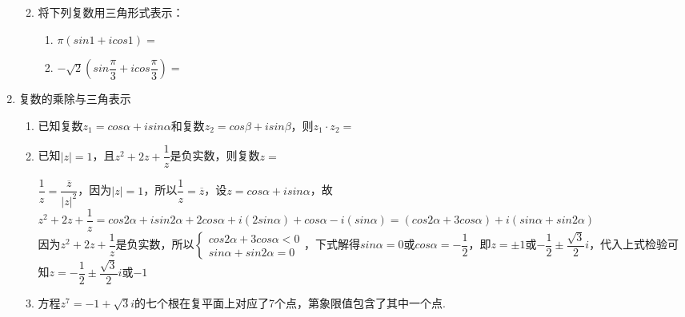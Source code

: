 \begin{enumerate}
\begin{enumerate}
    \item 将下列复数用三角形式表示：
    \begin{enumerate}
        \item $\pi(sin1 + i cos1) = $
        \item $-\sqrt{2}\left(sin\dfrac{\pi}{3}+icos\dfrac{\pi}{3}\right) = $
    \end{enumerate}
\end{enumerate}
\item 复数的乘除与三角表示
\begin{enumerate}
    \item 已知复数$z_1 = cos\alpha + i  sin\alpha$和复数$z_2 = cos\beta + i  sin\beta$，则$z_1 \cdot z_2 = $
    \item 已知$|z| = 1$，且$z^2+2z+\dfrac{1}{z}$是负实数，则复数$z = $
    \begin{jieda}
        $\dfrac{1}{z} = \dfrac{\overline{z}}{|z|^2}$，因为$|z| = 1$，所以$\dfrac{1}{z} = \overline{z}$，设$z = cos\alpha+i sin\alpha$，故$z^2+2z+\dfrac{1}{z} = cos2\alpha + i sin2\alpha + 2 cos\alpha + i(2sin\alpha) + cos\alpha - i(sin\alpha) = (cos2\alpha + 3cos\alpha) + i(sin\alpha + sin2\alpha)$ \\
        因为$z^2+2z+\dfrac{1}{z}$是负实数，所以$\left \{ \begin{array}{l}
            cos2\alpha + 3cos\alpha < 0   \\
            sin\alpha + sin2\alpha = 0  
        \end{array}\right.$，下式解得$sin\alpha = 0$或$cos\alpha = -\dfrac{1}{2}$，即$z = \pm1$或$-\dfrac{1}{2} \pm \dfrac{\sqrt{3}}{2} i$，代入上式检验可知$z = -\dfrac{1}{2} \pm \dfrac{\sqrt{3}}{2} i$或$-1$
    \end{jieda}
    \item 方程$z^7 = -1+\sqrt{3}i$的七个根在复平面上对应了7个点，第象限值包含了其中一个点.
    \begin{jieda}

\end{jieda}
\end{enumerate}
\end{enumerate}
